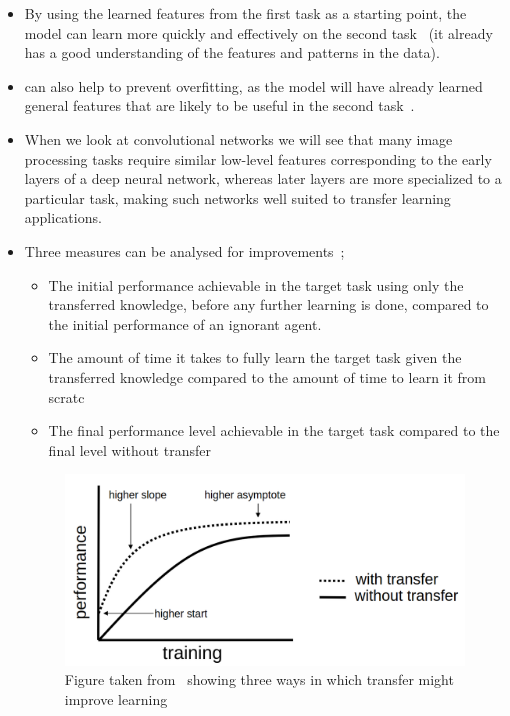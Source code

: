 \documentclass[11pt]{article}
\begin{document}
\begin{itemize}
    \item By using the learned features from the first task as a starting point, the model can learn more quickly and effectively on the second task~\cite{geeks-transfer-learning} (it already has a good understanding of the features and patterns in the data).
    \item can also help to prevent overfitting, as the model will have already learned general features that are likely to be useful in the second task~\cite{geeks-transfer-learning}.
    \item When we look at convolutional networks we will see that many image processing tasks require similar low-level features corresponding to the early layers of a deep neural network, whereas later layers are more specialized to a particular task, making such networks well suited to transfer learning applications.~\cite{deep-learning-book}
    \item Three measures can be analysed for improvements~\cite{torrey-handbook};

          \begin{itemize}
              \item The initial performance achievable in the target task using only the transferred knowledge, before any further learning is done, compared to the initial performance of an ignorant agent.
              \item The amount of time it takes to fully learn the target task given the transferred knowledge compared to the amount of time to learn it from scratc
              \item The final performance level achievable in the target task compared to the final level
                    without transfer
          \end{itemize}

          \begin{figure}[H]
              \centering
              \includegraphics[width=0.7\linewidth]{images/performance.png}
              \caption{Figure taken from~\cite{torrey-handbook} showing three ways in which transfer might improve learning}
             \label{fig:performance}
          \end{figure}


\end{itemize}
\end{document}
